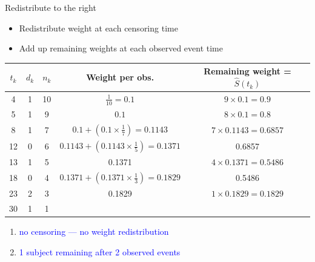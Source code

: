 \documentclass[10pt,t]{beamer}
\begin{document}
\begin{frame}{Redistribute to the right}
	
	
	\vspace{-5 mm}
	
	\begin{itemize}
		\item Redistribute weight at each censoring time
		
		\medskip
		
		\item Add up remaining weights at each observed event time
	\end{itemize}

\smallskip


	\begin{footnotesize}
		\begin{center}
		\begin{tabular}{|c|c|c|c|c|}
			\hline
			$t_k$ & $d_k$ & $n_k$ & Weight per obs. & Remaining weight = $\widehat{S}(t_k)$ \\
			\hline
			4 & 1 & 10 & $\frac{1}{10} = 0.1$ & $9\times 0.1= 0.9$\\
			5 & 1 & 9 & $0.1$ &  $8\times 0.1= 0.8$  \\
			8 & 1 & 7 & $0.1 + (0.1\times \frac{1}{7}) = 0.1143$ & $7 \times 0.1143 = 0.6857$\\
			12 & 0 & 6 & $0.1143 +  (0.1143\times\frac{1}{5}) = 0.1371$ &  0.6857\\
			13 & 1 & 5 & 0.1371 & $4 \times 0.1371 =0.5486 $\\
			18 & 0 & 4 & $0.1371 + (0.1371\times \frac{1}{3}) = 0.1829$ & 0.5486\\
			23 & 2 & 3 & 0.1829&  $1 \times 0.1829 = 0.1829$\\
			30 & 1 & 1 & & \\
			\hline
		\end{tabular}
	\end{center}
	\end{footnotesize}

\medskip

	\begin{enumerate}
		\item \textcolor{blue}{no censoring --- no weight redistribution}
		
		\medskip
		
		\item \textcolor{blue}{1 subject remaining after 2 observed events}
	\end{enumerate}
\end{frame}
\end{document}
